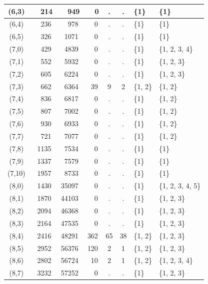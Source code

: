 \begin{table}[!ht]
\begin{center}
\begin{tabular}{|c|c|c|c|c|c|l|l|}
    \hline
    (6,3) & \ \ 214 & \ \ 949 & \ \ 0 & . & . &\{1\} & \{1\} \\
    \hline
    (6,4) & \ \ 236 & \ \ 978 & \ \ 0 & . & . &\{1\} & \{1\} \\
    \hline
    (6,5) & \ \ 326 & \ 1071 & \ \ 0 & . & . &\{1\} & \{1\} \\
    \hline
    (7,0) & \ \ 429 & \ 4839 & \ \ 0 & . & . &\{1\} & \{1, 2, 3, 4\} \\
    \hline
    (7,1) & \ \ 552 & \ 5932 & \ \ 0 & . & . &\{1\} & \{1, 2, 3\} \\
    \hline
    (7,2) & \ \ 605 & \ 6224 & \ \ 0 & . & . &\{1\} & \{1, 2, 3\} \\
    \hline
    (7,3) & \ \ 662 & \ 6364 & \ 39 & 9 & 2 & \{1, 2\} & \{1, 2\} \\
    \hline
    (7,4) & \ \ 836 & \ 6817 & \ \ 0 & . & . &\{1\} & \{1, 2\} \\
    \hline
    (7,5) & \ \ 807 & \ 7002 & \ \ 0 & . & . &\{1\} & \{1, 2\} \\
    \hline
    (7,6) & \ \ 930 & \ 6933 & \ \ 0 & . & . &\{1\} & \{1, 2\} \\
    \hline
    (7,7) & \ \ 721 & \ 7077 & \ \ 0 & . & . &\{1\} & \{1, 2\} \\
    \hline
    (7,8) & \ 1135 & \ 7534 & \ \ 0 & . & . &\{1\} & \{1\} \\
    \hline
    (7,9) & \ 1337 & \ 7579 & \ \ 0 & . & . &\{1\} & \{1\} \\
    \hline
    (7,10) & \ 1957 & \ 8733 & \ \ 0 & . & . &\{1\} & \{1\} \\
    \hline
    (8,0) & \ 1430 & 35097 & \ \ 0 & . & . &\{1\} & \{1, 2, 3, 4, 5\} \\
    \hline
    (8,1) & \ 1870 & 44103 & \ \ 0 & . & . &\{1\} & \{1, 2, 3\} \\
    \hline
    (8,2) & \ 2094 & 46368 & \ \ 0 & . & . &\{1\} & \{1, 2, 3\} \\
    \hline
    (8,3) & \ 2164 & 47535 & \ \ 0 & . & . &\{1\} & \{1, 2, 3\} \\
    \hline
    (8,4) & \ 2416 & 48291 & 362 & 65 & 38 & \{1, 2\} & \{1, 2, 3\} \\
    \hline
    (8,5) & \ 2952 & 56376 & 120 & 2 & 1 & \{1, 2\} & \{1, 2, 3\} \\
    \hline
    (8,6) & \ 2802 & 56724 & \ 10 & 2 & 1 & \{1, 2\} & \{1, 2, 3, 4\} \\
    \hline
    (8,7) & \ 3232 & 57252 & \ \ 0 & . & . &\{1\} & \{1, 2, 3\} \\
    \hline

\end{tabular}
\end{center}
\end{table}
